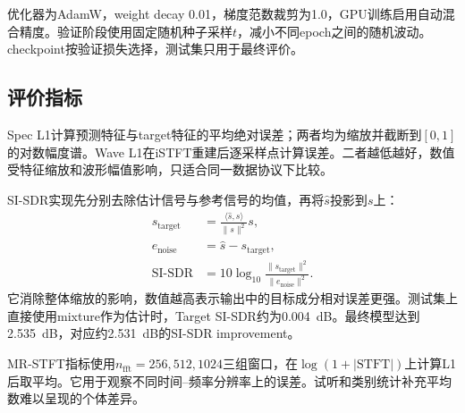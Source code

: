 \documentclass[UTF8,12pt,a4paper]{ctexart}
\begin{document}
\begin{table}[H]
  \centering
  \caption{主实验训练配置。}
  \label{tab:training-setting}
  \small
\end{table}

优化器为AdamW，weight decay 0.01，梯度范数裁剪为1.0，GPU训练启用自动混合精度。验证阶段使用固定随机种子采样$t$，减小不同epoch之间的随机波动。checkpoint按验证损失选择，测试集只用于最终评价。

\subsection{评价指标}

Spec L1计算预测特征与target特征的平均绝对误差；两者均为缩放并截断到$[0,1]$的对数幅度谱。Wave L1在iSTFT重建后逐采样点计算误差。二者越低越好，数值受特征缩放和波形幅值影响，只适合同一数据协议下比较。

SI-SDR实现先分别去除估计信号与参考信号的均值，再将$\hat s$投影到$s$上\cite{leroux2019sisdr}：
\begin{align}
  s_{\mathrm{target}}&=\frac{\langle\hat s,s\rangle}{\|s\|^2}s,\\
  e_{\mathrm{noise}}&=\hat s-s_{\mathrm{target}},\\
  \mathrm{SI\text{-}SDR}&=10\log_{10}\frac{\|s_{\mathrm{target}}\|^2}{\|e_{\mathrm{noise}}\|^2}.
\end{align}
它消除整体缩放的影响，数值越高表示输出中的目标成分相对误差更强。测试集上直接使用mixture作为估计时，Target SI-SDR约为0.004~dB。最终模型达到2.535~dB，对应约2.531~dB的SI-SDR improvement。

MR-STFT指标使用$n_{\mathrm{fft}}=256,512,1024$三组窗口，在$\log(1+|\mathrm{STFT}|)$上计算L1后取平均。它用于观察不同时间--频率分辨率上的误差。试听和类别统计补充平均数难以呈现的个体差异。
\end{document}

